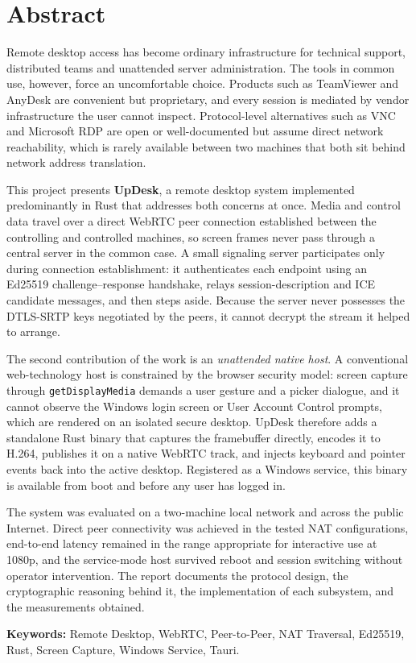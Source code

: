 \chapter*{Abstract}
\thispagestyle{plain}

Remote desktop access has become ordinary infrastructure for technical support,
distributed teams and unattended server administration. The tools in common use,
however, force an uncomfortable choice. Products such as TeamViewer and AnyDesk
are convenient but proprietary, and every session is mediated by vendor
infrastructure the user cannot inspect. Protocol-level alternatives such as VNC
and Microsoft RDP are open or well-documented but assume direct network
reachability, which is rarely available between two machines that both sit
behind network address translation.

This project presents \textbf{UpDesk}, a remote desktop system implemented
predominantly in Rust that addresses both concerns at once. Media and control
data travel over a direct WebRTC peer connection established between the
controlling and controlled machines, so screen frames never pass through a
central server in the common case. A small signaling server participates only
during connection establishment: it authenticates each endpoint using an
Ed25519 challenge--response handshake, relays session-description and ICE
candidate messages, and then steps aside. Because the server never possesses the
DTLS-SRTP keys negotiated by the peers, it cannot decrypt the stream it helped
to arrange.

The second contribution of the work is an \emph{unattended native host}. A
conventional web-technology host is constrained by the browser security model:
screen capture through \texttt{getDisplayMedia} demands a user gesture and a
picker dialogue, and it cannot observe the Windows login screen or User Account
Control prompts, which are rendered on an isolated secure desktop. UpDesk
therefore adds a standalone Rust binary that captures the framebuffer directly,
encodes it to H.264, publishes it on a native WebRTC track, and injects keyboard
and pointer events back into the active desktop. Registered as a Windows
service, this binary is available from boot and before any user has logged in.

The system was evaluated on a two-machine local network and across the public
Internet. Direct peer connectivity was achieved in the tested NAT
configurations, end-to-end latency remained in the range appropriate for
interactive use at 1080p, and the service-mode host survived reboot and session
switching without operator intervention. The report documents the protocol
design, the cryptographic reasoning behind it, the implementation of each
subsystem, and the measurements obtained.

\vspace{0.6cm}
\noindent\textbf{Keywords:} Remote Desktop, WebRTC, Peer-to-Peer, NAT Traversal,
Ed25519, Rust, Screen Capture, Windows Service, Tauri.

\clearpage

